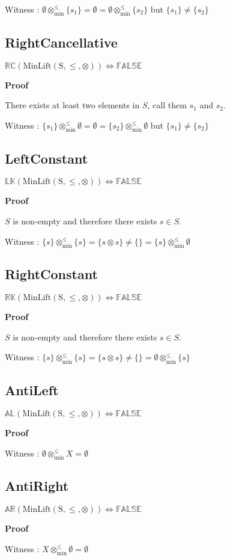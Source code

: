 \documentclass[10pt]{article}
\newcommand{\propname}[1]{{\mathbb{#1}}}
\newcommand{\minlift}{\otimes_{\min}^{\leq}}
\newcommand{\proof}{\vspace{1em} \textbf{Proof} \vspace{1em}}
\begin{document}
\vspace{0.5em}

Witness : $\emptyset \minlift \{s_1\} = \emptyset = \emptyset \minlift \{s_2\} $ but $\{s_1\} \neq \{s_2\}$



\subsection{RightCancellative}
$\propname{RC}(\mathrm{MinLift(S,\leq,\otimes)}) \Leftrightarrow \propname{FALSE}$

\proof

There exists at least two elements in $S$, call them $s_1$ and $s_2$.

\vspace{0.5em}

Witness : $\{s_1\} \minlift \emptyset = \emptyset = \{s_2\} \minlift \emptyset$ but $\{s_1\} \neq \{s_2\}$



\subsection{LeftConstant}
$\propname{LK}(\mathrm{MinLift(S,\leq,\otimes)}) \Leftrightarrow \propname{FALSE}$

\proof

$S$ is non-empty and therefore there exists $s \in S$.

\vspace{0.5em}

Witness : $\{s\} \minlift \{s\} = \{s \otimes s\} \neq \{\} = \{s\} \minlift \emptyset$



\subsection{RightConstant}
$\propname{RK}(\mathrm{MinLift(S,\leq,\otimes)}) \Leftrightarrow \propname{FALSE}$

\proof

$S$ is non-empty and therefore there exists $s \in S$.

\vspace{0.5em}

Witness : $\{s\} \minlift \{s\} = \{s \otimes s\} \neq \{\} = \emptyset \minlift \{s\}$



\subsection{AntiLeft}
$\propname{AL}(\mathrm{MinLift(S,\leq,\otimes)}) \Leftrightarrow \propname{FALSE}$

\proof

Witness : $\emptyset \minlift X = \emptyset$



\subsection{AntiRight}
$\propname{AR}(\mathrm{MinLift(S,\leq,\otimes)}) \Leftrightarrow \propname{FALSE}$

\proof

Witness : $X \minlift \emptyset = \emptyset$
\end{document}
